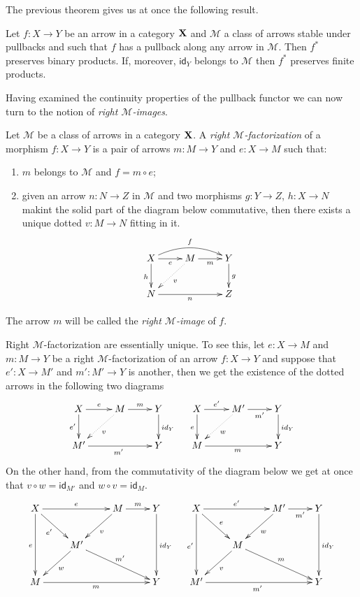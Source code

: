 \documentclass[a4paper,UKenglish,cleveref,pdftex,thm-restate,numberwithinsect]{lipics-v2021}
\newcommand{\id}[1]{\mathsf{id}_{#1}}
\def\X{\textbf {\textup{X}}}
\begin{document}
The previous theorem gives us at once the following result.

\begin{corollary} \label{cor:finlim}
	Let $f\colon X\to Y$ be an arrow in a category $\X$ and $\mathcal{M}$ a class of arrows stable under pullbacks and such that $f$ has a pullback along any arrow in $\mathcal{M}$. Then $f^*$ preserves binary products. If, moreover, $\id{Y}$ belongs to $\mathcal{M}$ then $f^*$ preserves finite products.
\end{corollary}

Having examined the continuity properties of the pullback functor we can now turn to the notion of \emph{right $\mathcal{M}$-images}.

\begin{definition}
	Let $\mathcal{M}$ be a class of arrows in a category $\X$. A \emph{right $\mathcal{M}$-factorization
	} of a morphism $f\colon X\to Y$ is a pair of arrows $m\colon M\to Y$ and $e\colon X\to M$ such that:
	\begin{enumerate}
		\item $m$ belongs to $\mathcal{M}$ and $f=m\circ e$;
		\item given an arrow $n\colon N\to Z$ in $\mathcal{M}$ and two morphisms $g\colon Y\to Z$, $h\colon X\to N$ makint the solid part of the diagram below commutative, then there exists a unique dotted $v\colon M\to N$ fitting in it.
		\[\xymatrix{X \ar[r]_-{e} \ar@/^.4cm/[rr]^{f} \ar[d]_{h}& M \ar[r]_-{m} \ar@{.>}[dl]^{v} & Y \ar[d]^{g}\\N \ar[rr]_{n} && Z}\] 
	\end{enumerate}  
	
	The arrow $m$ will be called the \emph{right $\mathcal{M}$-image} of $f$.
\end{definition}

\begin{remark}\label{rem:uniq}
	Right $\mathcal{M}$-factorization are essentially unique. To see this, let $e\colon X\to M$ and $m\colon M\to Y$ be a right $\mathcal{M}$-factorization of an arrow $f\colon X\to Y$ and suppose that  $e'\colon X\to M'$ and $m'\colon M'\to Y$ is another, then we  get the existence of the dotted arrows in the following two diagrams
	\[\xymatrix{X \ar[r]^-{e}  \ar[d]_-{e'}& M \ar[r]^-{m} \ar@{.>}[dl]^{v} & Y \ar[d]^{\id{Y}} & X \ar[r]^-{e'}  \ar[d]_{e}& M' \ar[r]_-{m'} \ar@{.>}[dl]^{w} & Y \ar[d]^{\id{Y}}\\M' \ar[rr]_{m'} && Y & M \ar[rr]_{m} && Y}\] 
	On the other hand, from the commutativity of the diagram below we get at once that $v\circ w=\id{M'}$ and $w\circ v=\id{M}$.
	\[\xymatrix{X \ar[rr]^-{e}  \ar[dr]_-{e'} \ar[dd]_{e}&& M \ar[r]^-{m} \ar[dl]^{v} & Y \ar[dd]^{\id{Y}} & X \ar[dr]^{e} \ar[rr]^-{e'}  \ar[dd]_{e'}&& M' \ar[r]_-{m'} \ar[dl]^{w} &Y \ar[dd]^{\id{Y}}\\ & M' \ar[dl]^{w}  \ar[drr]^{m'} &&&&M\ar[dl]^{v} \ar[drr]^{m}\\M \ar[rrr]_{m} &&& Y & M' \ar[rrr]_{m'} &&& Y}\] 
\end{remark}
\end{document}
